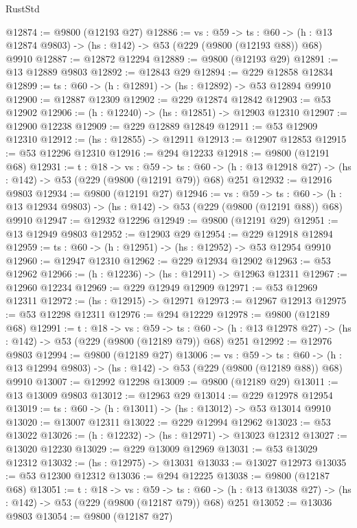 \begin{lexlean}{RustStd}
\begin{coremodule}
@12874 := @9800 (@12193 @27)
@12886 := {vs : @59} ->
  {ts : @60} -> (h : @13 @12874 @9803) -> (hs : @142) -> @53 (@229 (@9800 (@12193 @88)) @68) @9910
@12887 := @12872 @12294
@12889 := @9800 (@12193 @29)
@12891 := @13 @12889 @9803
@12892 := @12843 @29
@12894 := @229 @12858 @12834
@12899 := {ts : @60} -> (h : @12891) -> (hs : @12892) -> @53 @12894 @9910
@12900 := @12887 @12309
@12902 := @229 @12874 @12842
@12903 := @53 @12902
@12906 := (h : @12240) -> (hs : @12851) -> @12903 @12310
@12907 := @12900 @12238
@12909 := @229 @12889 @12849
@12911 := @53 @12909 @12310
@12912 := (hs : @12855) -> @12911
@12913 := @12907 @12853
@12915 := @53 @12296 @12310
@12916 := @294 @12233
@12918 := @9800 (@12191 @68)
@12931 := {t : @18} ->
  {vs : @59} ->
  {ts : @60} -> (h : @13 @12918 @27) -> (hs : @142) -> @53 (@229 (@9800 (@12191 @79)) @68) @251
@12932 := @12916 @9803
@12934 := @9800 (@12191 @27)
@12946 := {vs : @59} ->
  {ts : @60} -> (h : @13 @12934 @9803) -> (hs : @142) -> @53 (@229 (@9800 (@12191 @88)) @68) @9910
@12947 := @12932 @12296
@12949 := @9800 (@12191 @29)
@12951 := @13 @12949 @9803
@12952 := @12903 @29
@12954 := @229 @12918 @12894
@12959 := {ts : @60} -> (h : @12951) -> (hs : @12952) -> @53 @12954 @9910
@12960 := @12947 @12310
@12962 := @229 @12934 @12902
@12963 := @53 @12962
@12966 := (h : @12236) -> (hs : @12911) -> @12963 @12311
@12967 := @12960 @12234
@12969 := @229 @12949 @12909
@12971 := @53 @12969 @12311
@12972 := (hs : @12915) -> @12971
@12973 := @12967 @12913
@12975 := @53 @12298 @12311
@12976 := @294 @12229
@12978 := @9800 (@12189 @68)
@12991 := {t : @18} ->
  {vs : @59} ->
  {ts : @60} -> (h : @13 @12978 @27) -> (hs : @142) -> @53 (@229 (@9800 (@12189 @79)) @68) @251
@12992 := @12976 @9803
@12994 := @9800 (@12189 @27)
@13006 := {vs : @59} ->
  {ts : @60} -> (h : @13 @12994 @9803) -> (hs : @142) -> @53 (@229 (@9800 (@12189 @88)) @68) @9910
@13007 := @12992 @12298
@13009 := @9800 (@12189 @29)
@13011 := @13 @13009 @9803
@13012 := @12963 @29
@13014 := @229 @12978 @12954
@13019 := {ts : @60} -> (h : @13011) -> (hs : @13012) -> @53 @13014 @9910
@13020 := @13007 @12311
@13022 := @229 @12994 @12962
@13023 := @53 @13022
@13026 := (h : @12232) -> (hs : @12971) -> @13023 @12312
@13027 := @13020 @12230
@13029 := @229 @13009 @12969
@13031 := @53 @13029 @12312
@13032 := (hs : @12975) -> @13031
@13033 := @13027 @12973
@13035 := @53 @12300 @12312
@13036 := @294 @12225
@13038 := @9800 (@12187 @68)
@13051 := {t : @18} ->
  {vs : @59} ->
  {ts : @60} -> (h : @13 @13038 @27) -> (hs : @142) -> @53 (@229 (@9800 (@12187 @79)) @68) @251
@13052 := @13036 @9803
@13054 := @9800 (@12187 @27)

\end{coremodule}
\end{lexlean}
